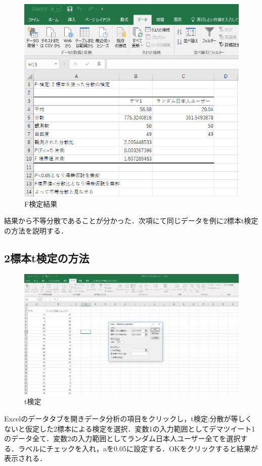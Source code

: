 \begin{figure}[htb]
\centering
\includegraphics[width=13cm]{f2.png}
\caption{F検定結果}\label{19}
\end{figure}
結果から不等分散であることが分かった．次項にて同じデータを例に2標本t検定の方法を説明する．
\clearpage

\subsection{2標本t検定の方法}
\begin{figure}[htb]
\centering
\includegraphics[width=13cm]{t1.png}
\caption{t検定}\label{20}
\end{figure}
Excelのデータタブを開きデータ分析の項目をクリックし，t検定:分散が等しくないと仮定した2標本による検定を選択．変数1の入力範囲としてデマツイート1のデータ全て．変数2の入力範囲としてランダム日本人ユーザー全てを選択する．ラベルにチェックを入れ，aを0.05に設定する．OKをクリックすると結果が表示される．
\clearpage

